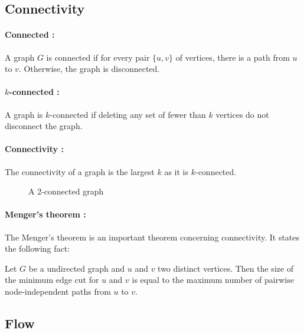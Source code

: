 \subsection{Connectivity}
\paragraph{Connected :}\label{defConnectivity}
A graph $G$ is connected if for every pair $\{u,v\}$ of vertices, there is a 
path from $u$ to $v$. Otherwise, the graph is disconnected.

\paragraph{$k$-connected :}
A graph is $k$-connected if deleting any set of fewer than $k$ vertices do not 
disconnect the graph.

\paragraph{Connectivity :}
The connectivity of a graph is the largest $k$ as it is $k$-connected. 

\begin{figure}[!h]
  \begin{center}
    
  \end{center}
  \caption{A 2-connected graph}
\end{figure}

\paragraph{Menger's theorem :}
The Menger's theorem is an important theorem concerning connectivity.
It states the following fact:

Let $G$ be a undirected graph and $u$ and $v$ two distinct vertices.
Then the size of the minimum edge cut for $u$ and $v$ is equal to the maximum
number of pairwise node-independent paths from $u$ to $v$.



\subsection{Flow}
